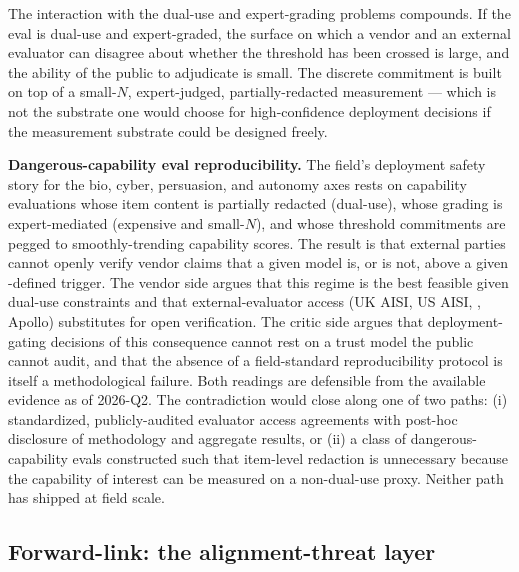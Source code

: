 The interaction with the dual-use and expert-grading problems
compounds. If the eval is dual-use and expert-graded, the surface
on which a vendor and an external evaluator can disagree about
whether the threshold has been crossed is large, and the ability of
the public to adjudicate is small. The discrete commitment is built
on top of a small-$N$, expert-judged, partially-redacted measurement
--- which is not the substrate one would choose for high-confidence
deployment decisions if the measurement substrate could be designed
freely.

\begin{contradiction}
\textbf{Dangerous-capability eval reproducibility.} The field's
deployment safety story for the bio, cyber, persuasion, and autonomy
axes rests on capability evaluations whose item content is partially
redacted (dual-use), whose grading is expert-mediated (expensive
and small-$N$), and whose threshold commitments are pegged to
smoothly-trending capability scores. The result is that external
parties cannot openly verify vendor claims that a given model is, or
is not, above a given -defined trigger. The vendor side argues
that this regime is the best feasible given dual-use constraints
and that external-evaluator access (UK AISI, US AISI, , Apollo)
substitutes for open verification. The critic side argues that
deployment-gating decisions of this consequence cannot rest on a
trust model the public cannot audit, and that the absence of a
field-standard reproducibility protocol is itself a methodological
failure. Both readings are defensible from the available evidence as
of 2026-Q2. The contradiction would close along one of two paths:
(i) standardized, publicly-audited evaluator access agreements with
post-hoc disclosure of methodology and aggregate results, or (ii) a
class of dangerous-capability evals constructed such that item-level
redaction is unnecessary because the capability of interest can be
measured on a non-dual-use proxy. Neither path has shipped at field
scale.
\end{contradiction}

\subsection{Forward-link: the alignment-threat layer}
\label{sec:dangerous-capability-forward}


